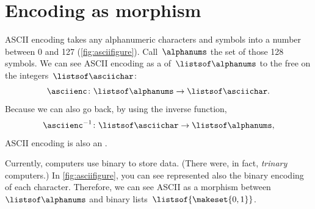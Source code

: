 \section{Encoding as morphism }



\begin{example}
    ASCII encoding takes any alphanumeric characters and symbols into a number between 0 and 127 (\cref{fig:asciifigure}).
    Call~$\alphanums$ the set of those 128 symbols.
    We can see ASCII encoding as a  of~$\listsof\alphanums$ to the free  on the integers~$\listsof\asciichar$:
    \begin{equation}
        \label{eq:ASCII-semi}
        \asciienc\colon \listsof\alphanums \to \listsof\asciichar.
    \end{equation}
    Because we can also go back, by using the inverse function,
    \begin{equation}
        \label{eq:ASCII-semi-inv}
        \asciienc^{-1}\colon \listsof\asciichar \to \listsof\alphanums,
    \end{equation}
    ASCII encoding is also an .
\end{example}

\begin{example}
    Currently, computers use binary to store data. (There were, in fact, \emph{trinary} computers.)
    In \cref{fig:asciifigure}, you can see represented also the binary encoding of each character.
    Therefore, we can see ASCII as a morphism between~$\listsof\alphanums$ and binary lists~$\listsof{\makeset{0,1}}$.
\end{example}

